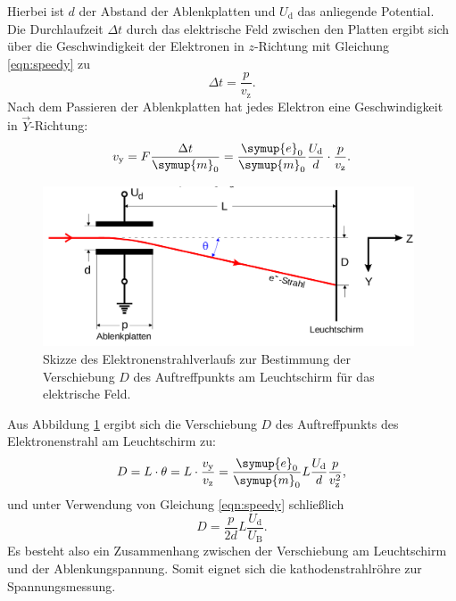 Hierbei ist $d$ der Abstand der Ablenkplatten und $U_\mathrm{d}$ das anliegende Potential.\\
Die Durchlaufzeit $\Delta t$ durch das elektrische Feld zwischen den Platten ergibt sich über die Geschwindigkeit der Elektronen in $z$-Richtung mit Gleichung \eqref{eqn:speedy} zu
\begin{equation}
  \Delta t=\frac{p}{v_\mathrm{z}} \text{.}
\end{equation}
Nach dem Passieren der Ablenkplatten hat jedes Elektron eine Geschwindigkeit in $\vec{Y}$-Richtung:
\begin{equation}
  v_\mathrm{y}=F \frac{\Delta t}{\symup{m}_0}=\frac{\symup{e}_0}{\symup{m}_0}\frac{U_\mathrm{d}}{d}\cdot\frac{p}{v_\mathrm{z}} \text{.}
\end{equation}
\begin{figure}
  \centering
  \includegraphics[width=0.98\textwidth]{Messdaten/ablenkung.png}
  \caption{Skizze des Elektronenstrahlverlaufs zur Bestimmung der Verschiebung $D$ des Auftreffpunkts am Leuchtschirm für das elektrische Feld.}
  \label{fig:ablenkii}
\end{figure}
Aus Abbildung \ref{fig:ablenkii} ergibt sich die Verschiebung $D$ des Auftreffpunkts des Elektronenstrahl am Leuchtschirm zu:
\begin{equation}
    D=L \cdot \theta=L \cdot \frac{v_\mathrm{y}}{v_\mathrm{z}}=\frac{\symup{e}_0}{\symup{m}_0}L\frac{U_\mathrm{d}}{d}\frac{p}{v_\mathrm{z}^2} \text{,}
\end{equation}
und unter Verwendung von Gleichung \eqref{eqn:speedy} schließlich
\begin{equation}
  \label{eqn:K}
  D=\frac{p}{2d}L\frac{U_\mathrm{d}}{U_\mathrm{B}} \text{.}
\end{equation}
Es besteht also ein Zusammenhang zwischen der Verschiebung am Leuchtschirm und der Ablenkungspannung. Somit eignet sich die kathodenstrahlröhre zur Spannungsmessung.
